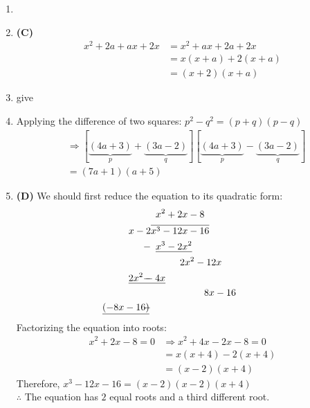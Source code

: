 \begin{multicols}{2}
\begin{enumerate}[label={\textbf{\arabic*.}}]
    \item 
    \item \textbf{(C)}
        \begin{align*} 
            x^2 + 2a + ax + 2x &= x^2 + ax + 2a + 2x \\
            &= x(x + a) + 2(x + a) \\
            &= (x + 2)(x + a)
        \end{align*}

    \item give
    
    \item Applying the difference of two squares: \(p^2 - q^2 = (p + q)(p - q)\)
        \begin{align*}
            &\Rightarrow [\underbrace{(4a + 3)}_{p} + \underbrace{(3a - 2)}_{q}][\underbrace{(4a + 3)}_{p} - \underbrace{(3a - 2)}_{q}] \\
            &= (7a + 1)(a + 5)
        \end{align*}
    
    \item \textbf{(D)} We should first reduce the equation to its quadratic form:
        \begin{align*}
            & \hspace{5pt} x^2 + 2x - 8 \\
            x - 2 & \overline{x^3 - 12x - 16} \\ 
            - & \hspace{5pt} \underline{x^3 - 2x^2} \\
            & \hspace{30pt} 2x^2 - 12x \\
            - & \hspace{-23pt} \underline{2x^2 - 4x} \\
            & \hspace{55pt} 8x - 16 \\
            - & \hspace{-50pt} \underline{(-8x - 16)}
        \end{align*}
        Factorizing the equation into roots:
        \begin{align*} 
            x^2 + 2x - 8 = 0 &\Rightarrow x^2 + 4x - 2x - 8 = 0 \\
            &= x(x + 4) - 2(x + 4) \\
            &= (x - 2)(x + 4)
        \end{align*}
        Therefore, \(x^3 - 12x - 16 = (x - 2)(x - 2)(x + 4) \) \\
        \(\therefore\) The equation has \(2\) equal roots and a third different root. 
            

\end{enumerate}
\end{multicols}
